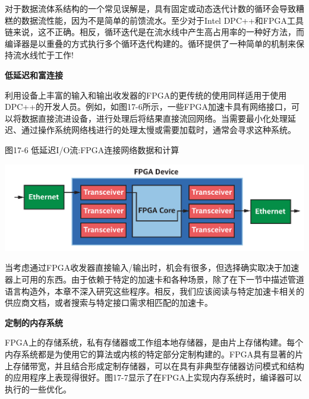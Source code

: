 \begin{tcolorbox}[colback=blue!5!white,colframe=blue!75!black, title=循环不是罪!]
对于数据流体系结构的一个常见误解是，具有固定或动态迭代计数的循环会导致糟糕的数据流性能，因为不是简单的前馈流水。至少对于Intel DPC++和FPGA工具链来说，这不正确。相反，循环迭代是在流水线中产生高占用率的一种好方法，而编译器是以重叠的方式执行多个循环迭代构建的。循环提供了一种简单的机制来保持流水线忙于工作!
\end{tcolorbox}

\hspace*{\fill} \par %
\textbf{低延迟和富连接}

利用设备上丰富的输入和输出收发器的FPGA的更传统的使用同样适用于使用DPC++的开发人员。例如，如图17-6所示，一些FPGA加速卡具有网络接口，可以将数据直接流进设备，进行处理后将结果直接流回网络。当需要最小化处理延迟、通过操作系统网络栈进行的处理太慢或需要加载时，通常会寻求这种系统。\par

\hspace*{\fill} \par %
图17-6 低延迟I/O流:FPGA连接网络数据和计算
\begin{center}
	\includegraphics[width=1.0\textwidth]{content/chapter-17/images/7}
\end{center}

当考虑通过FPGA收发器直接输入/输出时，机会有很多，但选择确实取决于加速器上可用的东西。由于依赖于特定的加速卡和各种场景，除了在下一节中描述管道语言构造外，本章不深入研究这些程序。相反，我们应该阅读与特定加速卡相关的供应商文档，或者搜索与特定接口需求相匹配的加速卡。\par

\hspace*{\fill} \par %
\textbf{定制的内存系统}

FPGA上的存储系统，私有存储器或工作组本地存储器，是由片上存储构建。每个内存系统都是为使用它的算法或内核的特定部分定制构建的。FPGA具有显著的片上存储带宽，并且结合形成定制存储器，可以在具有非典型存储器访问模式和结构的应用程序上表现得很好。图17-7显示了在FPGA上实现内存系统时，编译器可以执行的一些优化。\par

